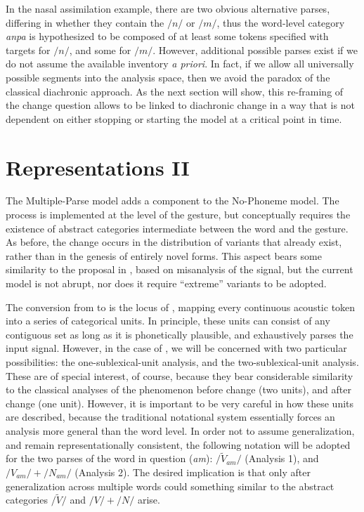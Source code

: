 In the nasal assimilation example, there are two obvious alternative
parses, differing in whether they contain the  $/n/$ or $/m/$,
thus the word-level category \textit{anpa} is hypothesized to be composed
of at least some tokens specified with  targets for $/n/$,
and some for $/m/$. However, additional possible parses exist if
we do not assume the available  inventory \emph{a priori}.
In fact, if we allow all universally possible segments into the analysis
space, then we avoid the  paradox of the classical diachronic
approach. As the next section will show, this re-framing of the change
question allows  to be linked to diachronic change
in a way that is not dependent on either stopping or starting the
model at a critical point in time. 

\section{Representations II}

The Multiple-Parse model adds a  component to the No-Phoneme
model. The process is implemented at the level of the 
gesture, but conceptually requires the existence of abstract categories
intermediate between the word and the gesture. As before, the change
occurs in the distribution of variants that already exist, rather
than in the genesis of entirely novel forms. This aspect bears some
similarity to the proposal in \citet{Baker2011}, based on misanalysis
of the signal, but the current model is not abrupt, nor does it require
“extreme” variants to be adopted.

The conversion from  to  is the locus of 
, mapping every continuous acoustic token into a series of
categorical units. In principle, these units can consist of any contiguous
set as long as it is phonetically plausible, and exhaustively parses
the input signal. However, in the case of , we will
be concerned with two particular possibilities: the one-sublexical-unit
analysis, and the two-sublexical-unit analysis. These are of special
interest, of course, because they bear considerable similarity to
the classical analyses of the phenomenon before change (two units),
and after change (one unit). However, it is important to be very careful
in how these units are described, because the traditional notational
system essentially forces an analysis more general than the
word level. In order not to assume generalization, and remain representationally
consistent, the following notation will be adopted for the two 
parses of the word in question (\textit{am}): $/\tilde{V}_{am}/$ (Analysis
1), and $/V_{am}/+/N_{am}/$ (Analysis 2). The desired implication
is that only after generalization across multiple words could something
similar to the abstract categories $/\widetilde{V}/$ and $/V/+/N/$
arise.

